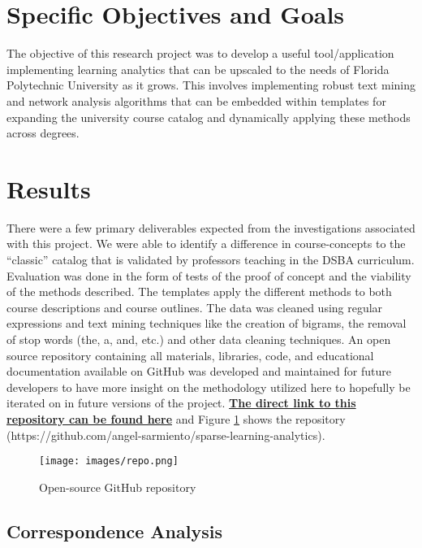 \documentclass[11pt]{report}
\begin{document}
\section{Specific Objectives and Goals}

The objective of this research project was to develop a useful tool/application implementing learning analytics that can be upscaled to the needs of Florida Polytechnic University as it grows. This involves implementing robust text mining and network analysis algorithms that can be embedded within templates for expanding the university course catalog and dynamically applying these methods across degrees. 

\section{Results}

There were a few primary deliverables expected from the investigations associated with this project. We were able to 
identify a difference in course-concepts to the “classic” catalog that is validated by professors teaching in the DSBA 
curriculum. Evaluation was done in the form of tests of the proof of concept and the viability of the methods described.  
The templates apply the different methods to both course descriptions and course outlines. The data was cleaned using 
regular expressions \citep{regex} and text mining techniques like the creation of bigrams, the removal of stop words 
(the, a, and, etc.) and other data cleaning techniques.  An open source repository containing all materials, libraries, 
code, and educational documentation available on GitHub was developed and maintained for future developers to have more 
insight on the methodology utilized here to hopefully be iterated on in future versions of the project.  
 \href{https://github.com/angel-sarmiento/sparse-learning-analytics}{\textbf{The direct link to this repository can be found here}} 
  and Figure \ref{fig:repo} shows the repository (https://github.com/angel-sarmiento/sparse-learning-analytics).  

\begin{figure}[H]
\centering

\texttt{[image: images/repo.png]}
\caption{Open-source GitHub repository}
\label{fig:repo}
\end{figure}


\subsection{Correspondence Analysis}
\label{ca} 
\end{document}
